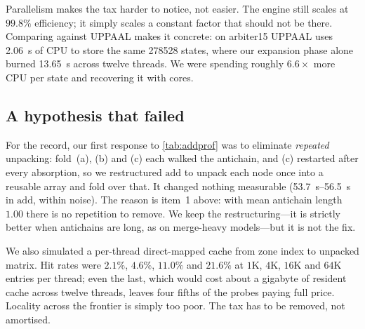 Parallelism makes the tax harder to notice, not easier.  The engine still
scales at $99.8\%$ efficiency; it simply scales a constant factor that should
not be there.  Comparing against UPPAAL makes it concrete: on arbiter15 UPPAAL
uses \SI{2.06}{\second} of CPU to store the same \num{278528} states, where our
expansion phase alone burned \SI{13.65}{\second} across twelve threads.  We were
spending roughly $6.6\times$ more CPU per state and recovering it with cores.

\subsection{A hypothesis that failed}

For the record, our first response to \cref{tab:addprof} was to eliminate
\emph{repeated} unpacking: fold~(a), (b) and (c) each walked the antichain, and
(c) restarted after every absorption, so we restructured $\mathrm{add}$ to
unpack each node once into a reusable array and fold over that.  It changed
nothing measurable (\SIrange{53.7}{56.5}{\second} in $\mathrm{add}$, within
noise).  The reason is item~1 above: with mean antichain length $1.00$ there is
no repetition to remove.  We keep the restructuring---it is strictly better when
antichains are long, as on merge-heavy models---but it is not the fix.

We also simulated a per-thread direct-mapped cache from zone index to unpacked
matrix.  Hit rates were $2.1\%$, $4.6\%$, $11.0\%$ and $21.6\%$ at $1$K, $4$K,
$16$K and $64$K entries per thread; even the last, which would cost about a
gigabyte of resident cache across twelve threads, leaves four fifths of the
probes paying full price.  Locality across the frontier is simply too poor.  The
tax has to be removed, not amortised.
